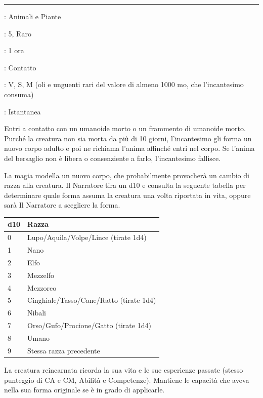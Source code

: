 \begin{multicols}{2}
\smallskip\noindent\rule{\linewidth}{2pt} \hypertarget{Reincarnazione}{}\medskip{}
\noindent
\begin{description}[noitemsep, topsep=0pt, parsep=0pt, partopsep=0pt, leftmargin=0cm, labelwidth=2.8cm]
	\item[\textbf{Lista di Magia}]: Animali e Piante
	\item[\textbf{Livello}]: 5, Raro
	\item[\textbf{T. di Lancio}]: 1 ora
	\item[\textbf{Gittata}]: Contatto
	\item[\textbf{Componenti}]: V, S, M (oli e unguenti rari del valore di almeno 1000 mo, che l'incantesimo consuma)
	\item[\textbf{Durata}]: Istantanea
\end{description}

Entri a contatto con un umanoide morto o un frammento di umanoide morto. Purché la creatura non sia morta da più di 10 giorni, l'incantesimo gli forma un nuovo corpo adulto e poi ne richiama l'anima affinché entri nel corpo. Se l'anima del bersaglio non è libera o consenziente a farlo, l'incantesimo fallisce.

La magia modella un nuovo corpo, che probabilmente provocherà un cambio di razza alla creatura. Il Narratore tira un d10 e consulta la seguente tabella per determinare quale forma assuma la creatura una volta riportata in vita, oppure sarà Il Narratore a scegliere la forma.

\medskip

\begin{tabular}{ll}
	\textbf{d10} &\textbf{Razza}\\
	\toprule
	0 & Lupo/Aquila/Volpe/Lince (tirate 1d4)\\
	1&Nano\\
	2&Elfo\\
	3&Mezzelfo\\
	4&Mezzorco\\
	5&Cinghiale/Tasso/Cane/Ratto (tirate 1d4)\\
	6&Nibali\\
	7&Orso/Gufo/Procione/Gatto (tirate 1d4)\\
	8&Umano\\
	9&Stessa razza precedente
\end{tabular}

\medskip

La creatura reincarnata ricorda la sua vita e le sue esperienze passate (stesso punteggio di CA e CM, Abilità e Competenze). Mantiene le capacità che aveva nella sua forma originale se è in grado di applicarle.


\end{multicols}
